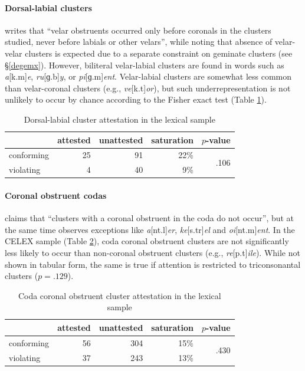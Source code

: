 \paragraph{Dorsal-labial clusters}
\citet[173]{Pierrehumbert1994} writes that ``velar obstruents occurred only before coronals in the clusters studied, never before labials or other velars'', while noting that absence of velar-velar clusters is expected due to a separate constraint on geminate clusters (see \S\ref{degemx}).
However, biliteral velar-labial clusters are found in words such as \emph{a}[k.m]\emph{e}, \emph{ru}[ɡ.b]\emph{y}, or \emph{pi}[ɡ.m]\emph{ent}.
Velar-labial clusters are somewhat less common than velar-coronal clusters (e.g., \emph{ve}[k.t]\emph{or}), but such underrepresentation is not unlikely to occur by chance according to the Fisher exact test (Table \ref{dltab}).

\begin{table}
\centering
\begin{tabular}{l rrrr}
\toprule
           & attested & unattested & saturation & $p$-value \\
\midrule
conforming & 25       & 91         & 22\%       & \multirow{2}{*}{.106} \\
violating  &  4       & 40         &  9\%       \\
\bottomrule
\end{tabular}
\caption{Dorsal-labial cluster attestation in the lexical sample}
\label{dltab}
\end{table}

\paragraph{Coronal obstruent codas}
\citet[175]{Pierrehumbert1994} claims that ``clusters with a coronal obstruent in the coda do not occur'', but at the same time observes exceptions like \emph{a}[nt.l]\emph{er}, \emph{ke}[s.tr]\emph{el} and \emph{oi}[nt.m]\emph{ent}.
In the CELEX sample (Table \ref{cctab}), coda coronal obstruent clusters are not significantly less likely to occur than non-coronal obstruent clusters (e.g., \emph{re}[p.t]\emph{ile}).
While not shown in tabular form, the same is true if attention is restricted to triconsonantal clusters ($p = .129$).

\begin{table}
\centering
\begin{tabular}{l rrrr}
\toprule
           & attested & unattested & saturation & $p$-value \\
\midrule
conforming & 56       & 304        & 15\%       & \multirow{2}{*}{.430} \\
violating  & 37       & 243        & 13\%       \\
\bottomrule
\end{tabular}
\caption{Coda coronal obstruent cluster attestation in the lexical sample}
\label{cctab}
\end{table}

